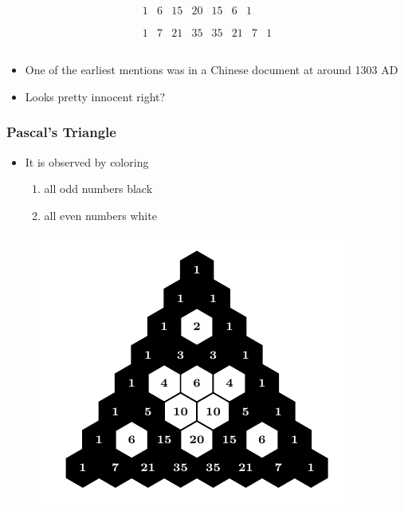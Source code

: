 \documentclass{beamer}
\begin{document}
\begin{frame}
\begin{equation*}
\begin{array}{c}
\begin{array}{ccccccc}
             1 & 6 & 15 & 20 & 15 & 6 & 1 \\
            \end{array}
             \\
            \begin{array}{cccccccc}
             1 & 7 & 21 & 35 & 35 & 21 & 7 & 1 \\
            \end{array}
             \\
            \end{array}
    \end{equation*}
    \begin{itemize}
        \item
        One of the earliest mentions was in a Chinese document at around 1303 AD
        \item
        Looks pretty innocent right?
    \end{itemize}

\end{frame}
\begin{frame}
    \frametitle{Pascal's Triangle}
    \begin{itemize}
        \item It is observed by coloring 
        \begin{enumerate}
            \item all odd numbers black
            \item all even numbers white
        \end{enumerate}
    \end{itemize}
    \begin{figure}
        \centering
        \includegraphics[scale=0.8]{Mod2,7.pdf}
    \end{figure}
\end{frame}
\end{document}

